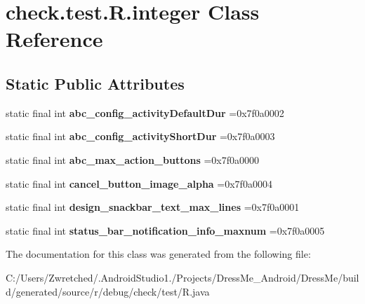\hypertarget{classcheck_1_1test_1_1_r_1_1integer}{}\section{check.\+test.\+R.\+integer Class Reference}
\label{classcheck_1_1test_1_1_r_1_1integer}
\subsection*{Static Public Attributes}
\begin{DoxyCompactItemize}
\item 
\hypertarget{classcheck_1_1test_1_1_r_1_1integer_a4496b10ed558f88e571d20c75f7d04cb}{}static final int {\bfseries abc\+\_\+config\+\_\+activity\+Default\+Dur} =0x7f0a0002\label{classcheck_1_1test_1_1_r_1_1integer_a4496b10ed558f88e571d20c75f7d04cb}

\item 
\hypertarget{classcheck_1_1test_1_1_r_1_1integer_ada6f74d19f5bfb1ef99c034e23d4d4e8}{}static final int {\bfseries abc\+\_\+config\+\_\+activity\+Short\+Dur} =0x7f0a0003\label{classcheck_1_1test_1_1_r_1_1integer_ada6f74d19f5bfb1ef99c034e23d4d4e8}

\item 
\hypertarget{classcheck_1_1test_1_1_r_1_1integer_aecdb9fa9573c8ee5c0f7daf202653996}{}static final int {\bfseries abc\+\_\+max\+\_\+action\+\_\+buttons} =0x7f0a0000\label{classcheck_1_1test_1_1_r_1_1integer_aecdb9fa9573c8ee5c0f7daf202653996}

\item 
\hypertarget{classcheck_1_1test_1_1_r_1_1integer_aa0f6fbe724f746edc499cac5b9475dc5}{}static final int {\bfseries cancel\+\_\+button\+\_\+image\+\_\+alpha} =0x7f0a0004\label{classcheck_1_1test_1_1_r_1_1integer_aa0f6fbe724f746edc499cac5b9475dc5}

\item 
\hypertarget{classcheck_1_1test_1_1_r_1_1integer_ab5ac4d5d12619150b978f9bef589163a}{}static final int {\bfseries design\+\_\+snackbar\+\_\+text\+\_\+max\+\_\+lines} =0x7f0a0001\label{classcheck_1_1test_1_1_r_1_1integer_ab5ac4d5d12619150b978f9bef589163a}

\item 
\hypertarget{classcheck_1_1test_1_1_r_1_1integer_ac970cb362a34ce9359ee9ddb69a44883}{}static final int {\bfseries status\+\_\+bar\+\_\+notification\+\_\+info\+\_\+maxnum} =0x7f0a0005\label{classcheck_1_1test_1_1_r_1_1integer_ac970cb362a34ce9359ee9ddb69a44883}

\end{DoxyCompactItemize}


The documentation for this class was generated from the following file\+:\begin{DoxyCompactItemize}
\item 
C\+:/\+Users/\+Zwretched/.\+Android\+Studio1./\+Projects/\+Dress\+Me\+\_\+\+Android/\+Dress\+Me/build/generated/source/r/debug/check/test/R.\+java\end{DoxyCompactItemize}
